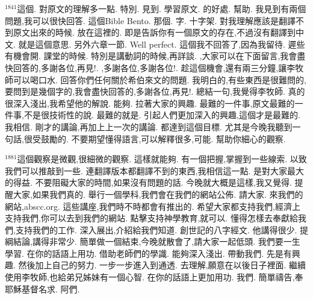 \documentclass{book}
\begin{document}
$^{1841}$這個.
對原文的理解多一點.
特別.
見到.
學習原文.
的好處.
幫助.
我見到有兩個問題,我可以很快回答.
這個Bible Bento.
那個.
字.
十字架.
對我理解應該是翻譯不到原文出來的時候.
放在這裡的.
即是告訴你有一個原文的存在,不過沒有翻譯到中文.
就是這個意思.
另外六章一節.
Well perfect.
這個我不回答了,因為我留待.
遲些有機會開.
課堂的時候.
特別是講動詞的時候,再詳談.
,大家可以在下面留言,我會盡快回答的,多謝各位,再見!.
,多謝各位,多謝各位!.
趁這個機會,還有兩三分鐘,讓李牧師可以喝口水.
回答你們任何關於希伯來文的問題.
我明白的,有些東西是很難問的,要問到是幾個字的,我會盡快回答的,多謝各位,再見!.
總結一句,我覺得李牧師.
真的很深入淺出,我希望他的解說.
能夠.
拉著大家的興趣.
最難的一件事,原文最難的一件事,不是很技術性的說.
最難的就是.
引起人們更加深入的興趣,這個才是最難的.
我相信.
剛才的講論,再加上上一次的講論.
都達到這個目標.
尤其是今晚我聽到一句話,很受鼓勵的.
不要期望懂得語言,可以解釋很多,可能.
幫助你細心的觀察.

$^{1881}$這個觀察是微觀,很細微的觀察.
這樣就能夠.
有一個把握,掌握到一些線索.
以致我們可以推敲到一些.
連翻譯版本都翻譯不到的東西,我相信這一點.
是對大家最大的得益.
不要阻礙大家的時間,如果沒有問題的話.
今晚就大概是這樣,我又覺得.
提醒大家,如果我們真的.
舉行一個學科,我們會在我們的網站公佈.
請大家.
來我們的網站,abscc.org.
這些講座,我們時不時都會有推出的.
希望大家都支持我們,經濟上支持我們,你可以去到我們的網站.
點擊支持神學教育,就可以.
懂得怎樣去奉獻給我們,支持我們的工作.
深入展出,介紹給我們知道.
創世記的八字經文.
他講得很少.
提綱結論,講得非常少.
簡單做一個結束,今晚就散會了,請大家一起低頭.
我們要一生學習.
在你的話語上用功.
借助老師們的學識.
能夠深入淺出.
帶動我們.
先是有興趣.
然後加上自己的努力.
一步一步進入到通透.
去理解,願意在以後日子裡面.
繼續使用李牧師,也給弟兄姊妹有一個心智.
在你的話語上更加用功.
我們.
簡單禱告,奉耶穌基督名求.
阿們.
\newpage
\end{document}
